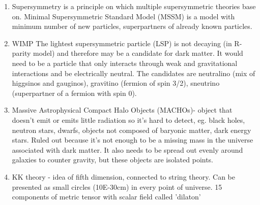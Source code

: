 \documentclass{article}
\begin{document}
\begin{enumerate}
    \item Supersymmetry is a principle on which multiple supersymmetric theories base on. Minimal Supersymmetric Standard Model (MSSM) is a model with minimum number of new particles, superpartners of already known particles. 
    \item WIMP
    The lightest supersymmetric particle (LSP) is not decaying (in R-parity model) and therefore may be a candidate for dark matter. It would need to be a particle that only interacts through weak and gravitational interactions and be electrically neutral. The candidates are neutralino (mix of higgsinos and gauginos), gravitino (fermion of spin 3/2), sneutrino (superpartner of a fermion with spin 0). 
    \item Massive Astrophysical Compact Halo Objects (MACHOs)- object that doesn't emit or emits little radiation so it's hard to detect, eg. black holes, neutron stars, dwarfs, objects not composed of baryonic matter, dark energy stars. Ruled out because it's not enough to be a missing mass in the universe associated with dark matter. It also needs to be spread out evenly around galaxies to counter gravity, but these objects are isolated points. 
    \item KK theory - idea of fifth dimension, connected to string theory. Can be presented as small circles (10E-30cm) in every point of universe. 15 components of metric tensor with scalar field called 'dilaton' 

\end{enumerate}
\end{document}
